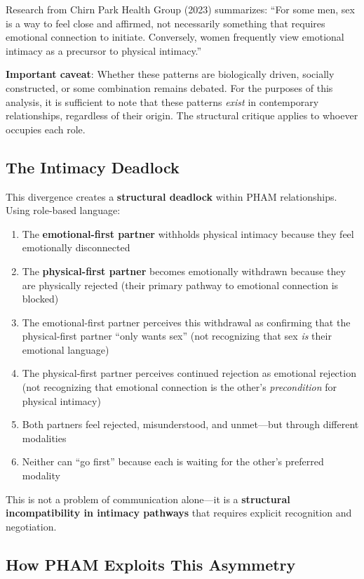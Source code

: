 \documentclass[12pt,openany]{book}
\numberwithin{equation}{chapter}
\begin{document}
Research from Chirn Park Health Group (2023) summarizes: ``For some men, sex is a way to feel close and affirmed, not necessarily something that requires emotional connection to initiate. Conversely, women frequently view emotional intimacy as a precursor to physical intimacy.''

\textbf{Important caveat}: Whether these patterns are biologically driven, socially constructed, or some combination remains debated. For the purposes of this analysis, it is sufficient to note that these patterns \textit{exist} in contemporary relationships, regardless of their origin. The structural critique applies to whoever occupies each role.

\subsection{The Intimacy Deadlock}

This divergence creates a \textbf{structural deadlock} within PHAM relationships. Using role-based language:

\begin{enumerate}
    \item The \textbf{emotional-first partner} withholds physical intimacy because they feel emotionally disconnected
    \item The \textbf{physical-first partner} becomes emotionally withdrawn because they are physically rejected (their primary pathway to emotional connection is blocked)
    \item The emotional-first partner perceives this withdrawal as confirming that the physical-first partner ``only wants sex'' (not recognizing that sex \textit{is} their emotional language)
    \item The physical-first partner perceives continued rejection as emotional rejection (not recognizing that emotional connection is the other's \textit{precondition} for physical intimacy)
    \item Both partners feel rejected, misunderstood, and unmet---but through different modalities
    \item Neither can ``go first'' because each is waiting for the other's preferred modality
\end{enumerate}

This is not a problem of communication alone---it is a \textbf{structural incompatibility in intimacy pathways} that requires explicit recognition and negotiation.

\subsection{How PHAM Exploits This Asymmetry}
\end{document}
